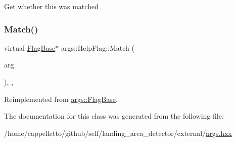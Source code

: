 Get whether this was matched \mbox{\label{classargs_1_1_help_flag_a1a555992a7c8350aca0ac1f292d91605}} 
\subsubsection{\texorpdfstring{Match()}{Match()}}
{\footnotesize\ttfamily virtual \hyperlink{classargs_1_1_flag_base}{Flag\+Base}$\ast$ args\+::\+Help\+Flag\+::\+Match (\begin{DoxyParamCaption}\item[{const \hyperlink{structargs_1_1_either_flag}{Either\+Flag} \&}]{arg }\end{DoxyParamCaption})\hspace{0.3cm}{\ttfamily [inline]}, {\ttfamily [override]}, {\ttfamily [virtual]}}



Reimplemented from \hyperlink{classargs_1_1_flag_base_a729ebb681d373f09875abb2e04f820f2}{args\+::\+Flag\+Base}.



The documentation for this class was generated from the following file\+:\begin{DoxyCompactItemize}
\item 
/home/cappelletto/github/self/landing\+\_\+area\+\_\+detector/external/\hyperlink{args_8hxx}{args.\+hxx}\end{DoxyCompactItemize}
